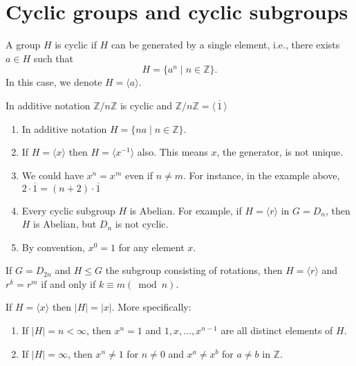 \documentclass[11pt,a4paper]{article}
\begin{document}
\def\contador{Lesson 7}


\section{Cyclic groups and cyclic subgroups}

\begin{defi}
    A group $H$ is cyclic if $H$ can be generated by a single element, i.e., there exists $a \in H$ such that
\[
H =  \{a^n \mid n \in \mathbb{Z}\} .
\]
In this case, we denote \(H =   \langle a \rangle\).
\end{defi}

\begin{exa}
    In additive notation $\mathbb{Z}/n\mathbb{Z}$ is cyclic and $\mathbb{Z}/n\mathbb{Z} = \langle \,\overline{1} \,\rangle$
\end{exa}


\begin{rem}\hfill\null
    \begin{enumerate}[label=(\roman*)]
        \item In additive notation $H = \{na \mid n \in \mathbb{Z}\}$. 
        \item If $ H  = \langle x \rangle$ then $ H  = \langle x^{-1} \rangle$ also. This means $x$, the generator, is not unique.
        \item We could have  $x^n =  x^m$ even if $n \neq m$. For instance, in the example above, \(2\cdot \overline{1} = (n+2)\cdot \overline{1}\)
        \item      Every cyclic subgroup $H$ is Abelian. For example, if $H = \langle r \rangle$ in $G = D_n$, then $H$ is Abelian, but $D_n$ is not cyclic.
        \item By convention, \(x^0 = 1\) for any element \(x\).
    \end{enumerate}
\end{rem}

\begin{eje}
    If $G = D_{2n}$ and \(H\leq G\) the subgroup consisting of rotations, then $H = \langle r \rangle$ and $r^k = r^m$ if and only if $k \equiv m (\bmod n)$.
\end{eje}


\begin{prop}
    If \( H = \langle x \rangle \) then \( \lvert H \rvert = \lvert x \rvert \). More specifically:
    \begin{enumerate}[label=(\roman*)]
        \item If \( \lvert H \rvert = n < \infty \), then \( x^n = 1 \) and \( 1, x, \dots, x^{n-1} \) are all distinct elements of \( H \).
        \item If \( \lvert H \rvert = \infty \), then \( x^n \neq 1 \) for \( n \neq 0 \) and \( x^a \neq x^b \) for \( a \neq b \) in \( \mathbb{Z} \).
    \end{enumerate}
\end{prop}
\end{document}

